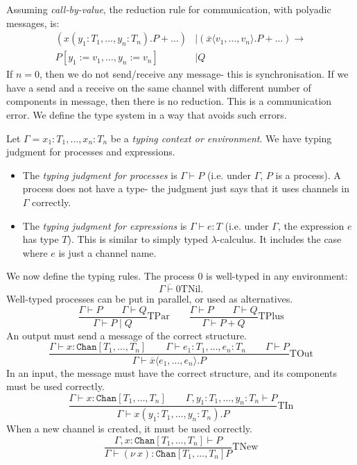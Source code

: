 \documentclass[a4paper, openany]{memoir}
\theoremstyle{definition}
\begin{document}
    Assuming \emph{call-by-value}, the reduction rule for communication, with polyadic messages, is:
    \begin{align*}
        (x(y_1 \colon T_1, \dots, y_n \colon T_n).P + \dots) &\mid 
        (\overline{x}\langle v_1, \dots, v_n \rangle.P + \dots) \to \\
        P[y_1 := v_1, \dots, y_n := v_n] &\mid Q
    \end{align*}
    If $n = 0$, then we do not send/receive any message- this is synchronisation. If we have a send and a receive on the same channel with different number of components in message, then there is no reduction. This is a communication error. We define the type system in a way that avoids such errors.

    Let $\Gamma = x_1 \colon T_1, \dots, x_n \colon T_n$ be a \emph{typing context or environment}. We have typing judgment for processes and expressions.
    \begin{itemize}
        \item The \emph{typing judgment for processes} is $\Gamma \vdash P$ (i.e. under $\Gamma$, $P$ is a process). A process does not have a type- the judgment just says that it uses channels in $\Gamma$ correctly. 
        \item The \emph{typing judgment for expressions} is $\Gamma \vdash e \colon T$ (i.e. under $\Gamma$, the expression $e$ has type $T$). This is similar to simply typed $\lambda$-calculus. It includes the case where $e$ is just a channel name.
    \end{itemize}
    
    We now define the typing rules. The process $0$ is well-typed in any environment:
    \[\overline{\Gamma \vdash 0} \textrm{TNil}.\]
    Well-typed processes can be put in parallel, or used as alternatives.
    \[\frac{\Gamma \vdash P \qquad \Gamma \vdash Q}{\Gamma \vdash P \mid Q} \textrm{TPar} \qquad \frac{\Gamma \vdash P \qquad \Gamma \vdash Q}{\Gamma \vdash P + Q} \textrm{TPlus}\]
    An output must send a message of the correct structure.
    \[\frac{\Gamma \vdash x \colon \texttt{Chan}[T_1, \dots, T_n] \qquad \Gamma \vdash e_1 \colon T_1, \dots, e_n \colon T_n \qquad \Gamma \vdash P}{\Gamma \vdash \overline{x} \langle e_1, \dots, e_n\rangle.P} \textrm{TOut}\]
    In an input, the message must have the correct structure, and its components must be used correctly.
    \[\frac{\Gamma \vdash x \colon \texttt{Chan}[T_1, \dots, T_n] \qquad \Gamma, y_1 \colon T_1, \dots, y_n \colon T_n \vdash P}{\Gamma \vdash x(y_1 \colon T_1, \dots, y_n \colon T_n).P} \textrm{TIn}\]
    When a new channel is created, it must be used correctly.
    \[\frac{\Gamma, x \colon \texttt{Chan}[T_1, \dots, T_n] \vdash P}{\Gamma \vdash (\nu \ x) \colon \texttt{Chan}[T_1, \dots, T_n] P} \textrm{TNew}\]
\end{document}
